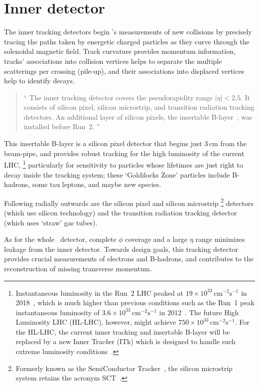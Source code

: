 \section{Inner detector}
\label{sec:atlas_inner}
The inner tracking detectors begin \atlas's measurements of new collisions
by precisely tracing the paths taken by energetic charged particles
as they curve through the solenoidal magnetic field.
Track curvature provides momentum information,
tracks' associations into collision vertices helps to separate the multiple
scatterings per crossing (pile-up),
and their associations into displaced vertices help to identify
decays.
\begin{quote}
``%
The inner tracking detector covers the pseudorapidity range $|\eta| < 2.5$.
It consists of silicon pixel, silicon microstrip, and transition radiation
tracking detectors.
An additional layer of silicon pixels, the insertable
B-layer~\cite{ATLAS-TDR-19, PIX-2018-001}, was installed before Run~2.%
''~\cite{atlas2022searches}
\end{quote}
This insertable B-layer is a silicon pixel detector that begins just
$3\,\textrm{cm}$ from the beam-pipe, and provides robust tracking for the
high luminosity of the current LHC,%
\footnote{%
Instantaneous luminosity in the Run~2 LHC peaked at
$19\times10^{33}\,\mathrm{cm}^{-2}\mathrm{s}^{-1}$ in 2018~\cite{ATLAS:2022hro},
which is much higher than previous conditions such as the Run~1 peak
instantaneous luminosity of
$3.6\times10^{33}\,\mathrm{cm}^{-2}\mathrm{s}^{-1}$ in 2012~\cite{ATLAS:2013tpw}.
The future High Luminosity LHC (HL-LHC), however, might achieve
$750\times10^{33}\,\mathrm{cm}^{-2}\mathrm{s}^{-1}$.
For the HL-LHC, the current inner tracking and insertable B-layer will be
replaced by a new Inner Trac\emph{k}er (ITk) which is designed to handle such
extreme luminosity conditions~\cite{CERN-LHCC-2017-021}.
}
particularly for sensitivity to particles whose lifetimes are just right to
decay inside the tracking system;
these `Goldilocks Zone' particles include B-hadrons, some tau leptons, and
maybe new species.

Following radially outwards are the silicon pixel and silicon microstrip%
\footnote{%
Formerly known as the SemiConductor Tracker~\cite{atlas1999design1},
the silicon microstrip system retains the acronym
SCT~\cite{atlas2008experiment}.%
}
detectors (which use silicon technology)
and the transition radiation tracking detector
(which uses `straw' gas tubes).

As for the whole \atlas\ detector, complete $\phi$ coverage and a large $\eta$
range minimizes leakage from the inner detector.
Towards design goals, this tracking detector provides crucial
measurements of electrons and B-hadrons,
and contributes to the reconstruction of missing transverse momentum.



